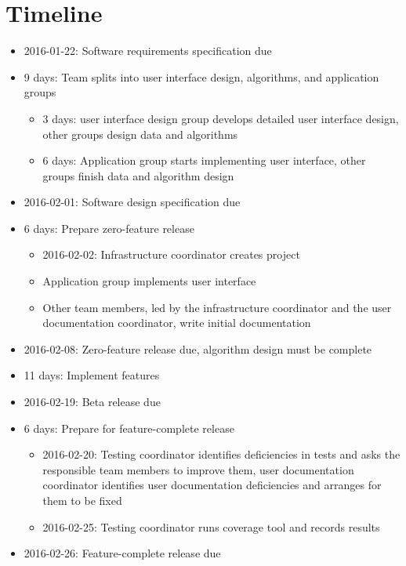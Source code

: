 \documentclass[10pt]{article}
\begin{document}
\section{Timeline}

\begin{itemize}
\item 2016-01-22: Software requirements specification due
\item 9 days: Team splits into user interface design, algorithms, and application groups
\begin{itemize}
    \item 3 days: user interface design group develops detailed user interface design,
    other groups design data and algorithms
    \item 6 days: Application group starts implementing user interface, other groups
    finish data and algorithm design
\end{itemize}
\item 2016-02-01: Software design specification due
\item 6 days: Prepare zero-feature release
\begin{itemize}
    \item 2016-02-02: Infrastructure coordinator creates project
    \item Application group implements user interface
    \item Other team members, led by the infrastructure coordinator and the user
    documentation coordinator, write initial documentation
\end{itemize}
\item 2016-02-08: Zero-feature release due, algorithm design must be complete
\item 11 days: Implement features
\item 2016-02-19: Beta release due
\item 6 days: Prepare for feature-complete release
\begin{itemize}
    \item 2016-02-20: Testing coordinator identifies deficiencies in tests and asks
    the responsible team members to improve them, user documentation coordinator
    identifies user documentation deficiencies and arranges for them to be fixed
    \item 2016-02-25: Testing coordinator runs coverage tool and records results
\end{itemize}
\item 2016-02-26: Feature-complete release due
\end{itemize}
\end{document}

